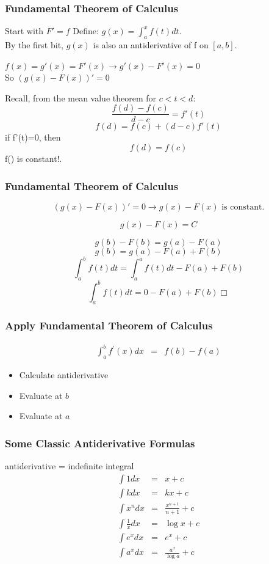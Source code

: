 \documentclass[handout]{beamer}
\numberwithin{equation}{section}
\begin{document}
\begin{frame}
\frametitle{Fundamental Theorem of Calculus}
Start with $F'=f$
Define: $g(x)=\int_a^x f(t)dt$.\\
By the first bit, $g(x)$ is also an antiderivative of f on $[a,b]$.\pause

$f(x)=g'(x)=F'(x)\rightarrow g'(x)-F'(x)=0$\\\pause
So $(g(x)-F(x))'=0$\pause

Recall, from the mean value theorem for $c<t<d$:
$$\frac{f(d)-f(c)}{d-c}=f'(t)$$\pause
$$f(d)=f(c)+(d-c)f'(t)$$\pause
if f'(t)=0, then 
$$f(d)=f(c)$$
f() is constant!.
\end{frame}

\begin{frame}
\frametitle{Fundamental Theorem of Calculus}
$$(g(x)-F(x))'=0 \rightarrow g(x)-F(x) \text{  is constant.}$$

$$g(x)-F(x) =C$$

$$g(b)-F(b)= g(a)-F(a)$$ \pause
$$g(b)= g(a)-F(a)+F(b)$$ \pause
$$\int_a^bf(t)dt =\int_a^af(t)dt-F(a)+F(b)$$\pause
$$\int_a^bf(t)dt =0-F(a)+F(b)\Box$$

\end{frame}



\begin{frame}
\frametitle{Apply Fundamental Theorem of Calculus}

\begin{eqnarray}
\int_{a}^{b} f^{'} (x) dx & = & f(b) - f(a) \nonumber 
\end{eqnarray} 

\begin{itemize}
\item[-] Calculate \alert{antiderivative}
\item[-] Evaluate at $b$
\item[-] Evaluate at $a$
\end{itemize}

\end{frame}



\begin{frame}
\frametitle{Some Classic Antiderivative Formulas} 

\alert{antiderivative} = \alert{indefinite integral}
\begin{eqnarray}
\int 1 dx & = &  x + c \nonumber \\
\int k dx & = & k x + c \nonumber \\
\int x^{n} dx & = & \frac{x^{n+1}}{n + 1} + c \nonumber \\
\int \frac{1}{x} dx & = & \log x + c \nonumber \\
\int e^{x} dx  & = & e^{x} + c \nonumber \\
\int a^{x} dx & = & \frac{a^{x} } {\log a }  + c \nonumber 
\end{eqnarray}

\end{frame}
\end{document}

